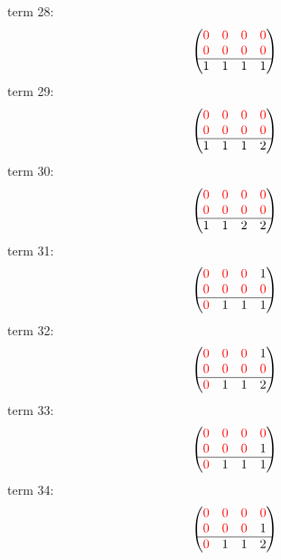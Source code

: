 \documentclass{article}
\begin{document}
term 28:
$$\begin{pmatrix}{\color{red} 0} & {\color{red} 0} & {\color{red} 0} & {\color{red} 0}\\
{\color{red} 0} & {\color{red} 0} & {\color{red} 0} & {\color{red} 0}\\
\hline1 & 1 & 1 & 1\\
\end{pmatrix}$$
term 29:
$$\begin{pmatrix}{\color{red} 0} & {\color{red} 0} & {\color{red} 0} & {\color{red} 0}\\
{\color{red} 0} & {\color{red} 0} & {\color{red} 0} & {\color{red} 0}\\
\hline1 & 1 & 1 & 2\\
\end{pmatrix}$$
term 30:
$$\begin{pmatrix}{\color{red} 0} & {\color{red} 0} & {\color{red} 0} & {\color{red} 0}\\
{\color{red} 0} & {\color{red} 0} & {\color{red} 0} & {\color{red} 0}\\
\hline1 & 1 & 2 & 2\\
\end{pmatrix}$$
term 31:
$$\begin{pmatrix}{\color{red} 0} & {\color{red} 0} & {\color{red} 0} & 1\\
{\color{red} 0} & {\color{red} 0} & {\color{red} 0} & {\color{red} 0}\\
\hline{\color{red} 0} & 1 & 1 & 1\\
\end{pmatrix}$$
term 32:
$$\begin{pmatrix}{\color{red} 0} & {\color{red} 0} & {\color{red} 0} & 1\\
{\color{red} 0} & {\color{red} 0} & {\color{red} 0} & {\color{red} 0}\\
\hline{\color{red} 0} & 1 & 1 & 2\\
\end{pmatrix}$$
term 33:
$$\begin{pmatrix}{\color{red} 0} & {\color{red} 0} & {\color{red} 0} & {\color{red} 0}\\
{\color{red} 0} & {\color{red} 0} & {\color{red} 0} & 1\\
\hline{\color{red} 0} & 1 & 1 & 1\\
\end{pmatrix}$$
term 34:
$$\begin{pmatrix}{\color{red} 0} & {\color{red} 0} & {\color{red} 0} & {\color{red} 0}\\
{\color{red} 0} & {\color{red} 0} & {\color{red} 0} & 1\\
\hline{\color{red} 0} & 1 & 1 & 2\\
\end{pmatrix}$$
\end{document}
